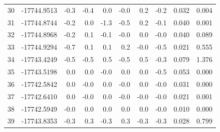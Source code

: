 \begin{longtable}{@{}crrrrrrrrr@{}}
30 & -17744.9513 & \textcolor{blue!24}{-0.3} & \textcolor{blue!25}{-0.4} & \textcolor{red!20}{0.0} & \textcolor{blue!20}{-0.0} & \textcolor{red!22}{0.2} & \textcolor{blue!22}{-0.2} & 0.032 & 0.004 \\
31 & -17744.8744 & \textcolor{blue!22}{-0.2} & \textcolor{red!20}{0.0} & \textcolor{blue!38}{-1.3} & \textcolor{blue!26}{-0.5} & \textcolor{red!22}{0.2} & \textcolor{blue!21}{-0.1} & 0.040 & 0.001 \\
32 & -17744.8968 & \textcolor{blue!22}{-0.2} & \textcolor{red!21}{0.1} & \textcolor{blue!20}{-0.1} & \textcolor{blue!20}{-0.0} & \textcolor{red!20}{0.0} & \textcolor{blue!20}{-0.0} & 0.040 & 0.089 \\
33 & -17744.9294 & \textcolor{blue!29}{-0.7} & \textcolor{red!20}{0.1} & \textcolor{red!20}{0.1} & \textcolor{red!23}{0.2} & \textcolor{blue!20}{-0.0} & \textcolor{blue!26}{-0.5} & 0.021 & 0.555 \\
34 & -17743.4249 & \textcolor{blue!26}{-0.5} & \textcolor{blue!26}{-0.5} & \textcolor{red!26}{0.5} & \textcolor{blue!26}{-0.5} & \textcolor{red!26}{0.5} & \textcolor{blue!24}{-0.3} & 0.079 & 1.376 \\
35 & -17743.5198 & \textcolor{red!20}{0.0} & \textcolor{red!20}{0.0} & \textcolor{blue!20}{-0.0} & \textcolor{red!20}{0.0} & \textcolor{red!20}{0.0} & \textcolor{blue!27}{-0.5} & 0.053 & 0.000 \\
36 & -17742.5842 & \textcolor{red!20}{0.0} & \textcolor{blue!20}{-0.0} & \textcolor{red!20}{0.0} & \textcolor{blue!20}{-0.0} & \textcolor{red!20}{0.0} & \textcolor{blue!20}{-0.0} & 0.031 & 0.000 \\
37 & -17742.6410 & \textcolor{red!20}{0.0} & \textcolor{blue!20}{-0.0} & \textcolor{red!20}{0.0} & \textcolor{blue!20}{-0.0} & \textcolor{blue!20}{-0.0} & \textcolor{blue!20}{-0.0} & 0.021 & 0.001 \\
38 & -17742.5949 & \textcolor{blue!20}{-0.0} & \textcolor{red!20}{0.0} & \textcolor{red!20}{0.0} & \textcolor{red!20}{0.0} & \textcolor{red!20}{0.0} & \textcolor{blue!20}{-0.0} & 0.010 & 0.000 \\
39 & -17743.8353 & \textcolor{blue!23}{-0.3} & \textcolor{red!23}{0.3} & \textcolor{blue!23}{-0.3} & \textcolor{red!23}{0.3} & \textcolor{blue!23}{-0.3} & \textcolor{blue!23}{-0.3} & 0.028 & 0.799 \\
\end{longtable}